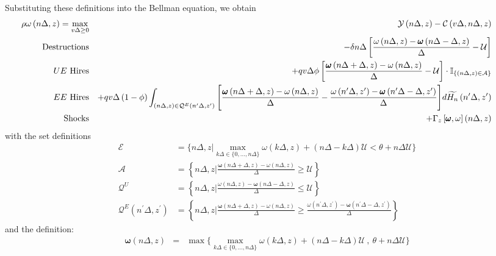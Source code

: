 \noindent Substituting these definitions into the Bellman equation, we
obtain
{\small
\begin{eqnarray*}
\hspace*{-1.9cm}\rho \omega \left( n\Delta ,z\right) =\max_{v\Delta\geq 0} && \mathcal{Y}
\left( n\Delta,z\right) -\mathcal{C}\left( v\Delta,n\Delta,z\right) \\
\text{Destructions} &&-\delta n\Delta \left[ \frac{\omega \left(
n\Delta,z\right) -\pmb{\omega}\left( n\Delta-\Delta,z\right)}{\Delta} -
\mathcal{U}\right] \\
\text{$UE$ Hires} &&+qv\Delta \phi \left[ \frac{\pmb{\omega}\left(
n\Delta+\Delta,z\right) -\omega \left( n\Delta,z\right)}{\Delta} -\mathcal{U}%
\right] \cdot \mathbb{I}_{\left\{ \left( n\Delta,z\right) \in \mathcal{A}%
\right\} } \\
\text{$EE$ Hires} &&+qv\Delta \left( 1-\phi \right) \int_{\left(
n\Delta,z\right) \in \mathcal{Q}^E\left( n^{\prime }\Delta,z^{\prime }\right) }%
\Bigg[\frac{ \pmb{\omega}\left( n\Delta+\Delta,z\right) -\omega \left(
n\Delta,z\right) }{\Delta} -\frac{ \omega \left( n^{\prime }\Delta,z^{\prime
}\right) -\pmb{\omega}\left( n^{\prime }\Delta-\Delta,z^{\prime }\right)%
}{\Delta} \Bigg]d\widetilde{H_n}\left( n^{\prime}\Delta,z^{\prime }\right) \\
\text{Shocks} &&+\Gamma_z\left[ \pmb{\omega},\omega \right]\left(
n\Delta,z\right)
\end{eqnarray*}}
with the set definitions
\begin{align*}
\mathcal{E} & =\Bigg\{ n\Delta,z\Bigg| \max_{k\Delta \in
\{0,...,n\Delta\}}\omega (k\Delta,z) +(n\Delta-k\Delta) \mathcal{U} < \theta
+ n \Delta \mathcal{U} \Bigg\} \\
\mathcal{A}& =\left\{ n \Delta,z\Bigg| \frac{\pmb{\omega}\left(
n\Delta+\Delta,z\right) -\omega \left( n\Delta,z\right)}{\Delta} \geq
\mathcal{U}\right\} \\
\mathcal{Q}^U & =\left\{ n\Delta,z\Bigg| \frac{\omega \left(
n\Delta,z\right) - \pmb{\omega}\left( n\Delta-\Delta,z\right)}{\Delta} \leq
\mathcal{U}\right\} \\
\mathcal{Q}^{E}\left( n^{\prime }\Delta,z^{\prime }\right) & =\left\{
n\Delta,z\Bigg|\frac{\pmb{\omega}\left( n\Delta+\Delta,z\right) -\omega
\left( n\Delta,z\right)}{\Delta} \geq \frac{\omega \left( n^{\prime
}\Delta,z^{\prime }\right) -\pmb{\omega}\left( n^{\prime
}\Delta-\Delta,z^{\prime }\right)}{\Delta} \right\}
\end{align*}%
and the definition:
\begin{eqnarray*}
\pmb{\omega}(n\Delta,z) &=& \max \Bigg\{ \max_{k\Delta \in
\{0,...,n\Delta\}} \omega(k\Delta,z) + (n\Delta-k\Delta) \mathcal{U} \ , \
\theta + n \Delta\mathcal{U} \Bigg\}
\end{eqnarray*}

